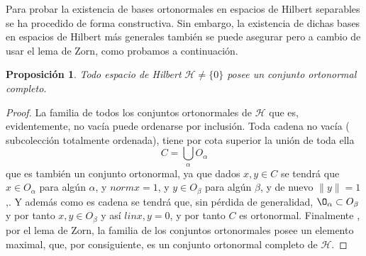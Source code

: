 \documentclass[12pt]{book}
\newtheorem{prop}{\bf Proposición}[chapter]
\newcommand{\norm}[1]{\lVert #1\rVert }
\begin{document}
Para probar la existencia de bases ortonormales en espacios de Hilbert separables se ha procedido de forma constructiva. Sin embargo, la existencia de dichas bases en espacios de Hilbert más generales también se puede asegurar pero a cambio de usar el lema de  Zorn, como probamos a continuación.

\begin{prop} Todo  espacio  de Hilbert  $\mathcal{H}\not=\{0\}$ posee un conjunto ortonormal completo.
\end{prop}
\begin{proof}
La familia de todos los conjuntos ortonormales de $\mathcal{H}$ que es, evidentemente, no vacía puede ordenarse  por inclusión. Toda cadena no vacía ( subcolección totalmente ordenada), tiene por cota superior la unión de toda ella
$$C=\bigcup_{\alpha} O_\alpha$$
que es también un conjunto ortonormal, ya que dados  $x,y\in C$ se tendrá que $x\in O_\alpha$ para algún $\alpha$, y $norm{x}=1$, y $y\in O_\beta$ para algún $\beta$, y de nuevo $\norm{y}=1$,. Y además como es cadena se tendrá que, sin pérdida de generalidad, $\O_\alpha\subset O_\beta$ y por  tanto $x,y\in O_\beta$ y así $lin{x,y}=0$, y por tanto  $C$ es ortonormal. 
Finalmente  ,  por el lema de Zorn, la familia de los conjuntos ortonormales  posee un elemento maximal, que, por consiguiente, es un conjunto ortonormal  completo  de $\mathcal{H}$.
\end{proof}
\end{document}
